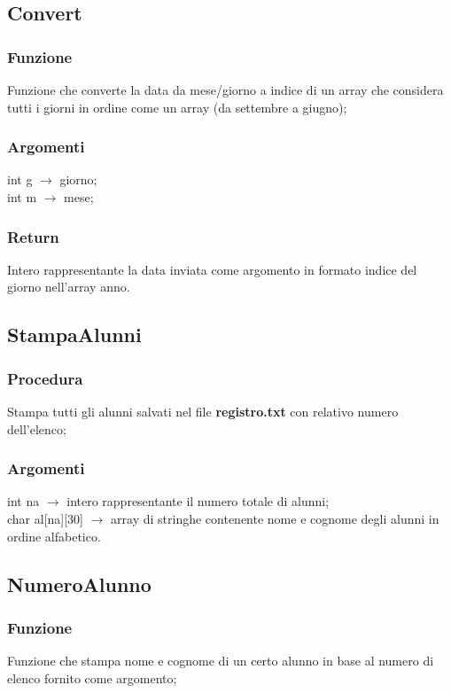 \documentclass[14pt]{extarticle}
\begin{document}
\subsection{Convert}
\subsubsection*{Funzione}
Funzione che converte la data da mese/giorno a indice di un array che considera tutti i giorni in ordine come un array (da settembre a giugno);
\subsubsection*{Argomenti}
int g $\longrightarrow$ giorno;
\\int m $\longrightarrow$ mese;
\subsubsection*{Return}
Intero rappresentante la data inviata come argomento in formato indice del giorno nell'array anno.
\vspace{50px}
\subsection{StampaAlunni}
\subsubsection*{Procedura}
Stampa tutti gli alunni salvati nel file \textbf{registro.txt} con relativo numero dell'elenco;
\subsubsection*{Argomenti}
int na $\longrightarrow$ intero rappresentante il numero totale di alunni;
\\char al[na][30] $\longrightarrow$ array di stringhe contenente nome e cognome degli alunni in ordine alfabetico.
\vspace{50px}
\subsection{NumeroAlunno}
\subsubsection*{Funzione}
Funzione che stampa nome e cognome di un certo alunno in base al numero di elenco fornito come argomento;
\end{document}
